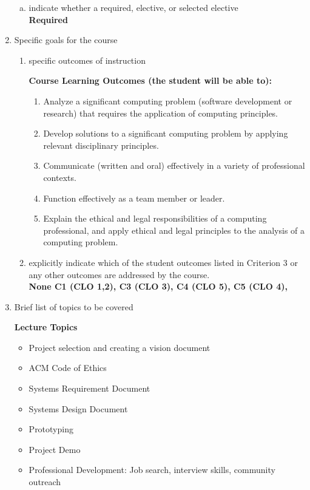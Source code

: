 \begin{enumerate}[1.]
\begin{enumerate}[a.]
\item indicate whether a required, elective, or selected elective\\ %
  {\bfseries
    Required
  }

\end{enumerate}

\item Specific goals for the course
\begin{enumerate}
\item specific outcomes of instruction\\ %
  {\bfseries
    Course Learning Outcomes (the student will be able to):
    \begin{enumerate}[1.]
      \item Analyze a significant computing problem (software development or research) that requires the application
      of computing principles.
      \item Develop solutions to a significant computing problem by applying relevant disciplinary principles.
      \item Communicate (written and oral) effectively in a variety of professional contexts.
      \item Function effectively as a team member or leader.
      \item Explain the ethical and legal responsibilities of a computing professional, and apply ethical and legal
      principles to the analysis of a computing problem.
   \end{enumerate}
  }

\item explicitly indicate which of the student outcomes listed in Criterion 3 or any other outcomes are addressed by the course.\\
  {\bfseries
    None
    C1 (CLO 1,2),
    C3 (CLO 3),
    C4 (CLO 5),
    C5 (CLO 4),
  }
\end{enumerate}

\item Brief list of topics to be covered\\
  {\bfseries
    Lecture Topics
    \begin{itemize}
      \item Project selection and creating a vision document
      \item ACM Code of Ethics
      \item Systems Requirement Document
      \item Systems Design Document
      \item Prototyping
      \item Project Demo
      \item Professional Development: Job search, interview skills, community outreach
    \end{itemize}
  }


\end{enumerate}
